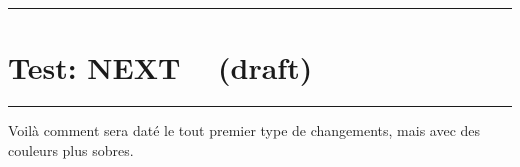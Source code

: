 \documentclass{../main/main}
\newcommand\docyear {2024}
\newcommand\docmonth{12}
\newcommand\docday  {18}
\newcommand\when{NEXT ~ (draft)}
\newcommand\filepath{next}
\newcommand\when{\docyear-\docmonth-\docday}
\newcommand\filepath{\docyear/\docmonth/\docday}
\begin{document}
\bgroup
    \color{red!75!black}
    \rule\linewidth{1pt}

    \vspace{-1em}
    \section*{\color{red!75!black} Test: \when}

    \vspace{-.75em}
    \rule\linewidth{1pt}
\egroup


\small

\bigskip

\begin{tdoctodo}[
    col       = ForestGreen,
    col-chges = Goldenrod,
    date      = 5678-90-12,
    version   = 1.2.3-rc.4
]
    \item Voilà comment sera daté le tout premier type de changements, mais avec des couleurs plus sobres.
\end{tdoctodo}



\end{document}
